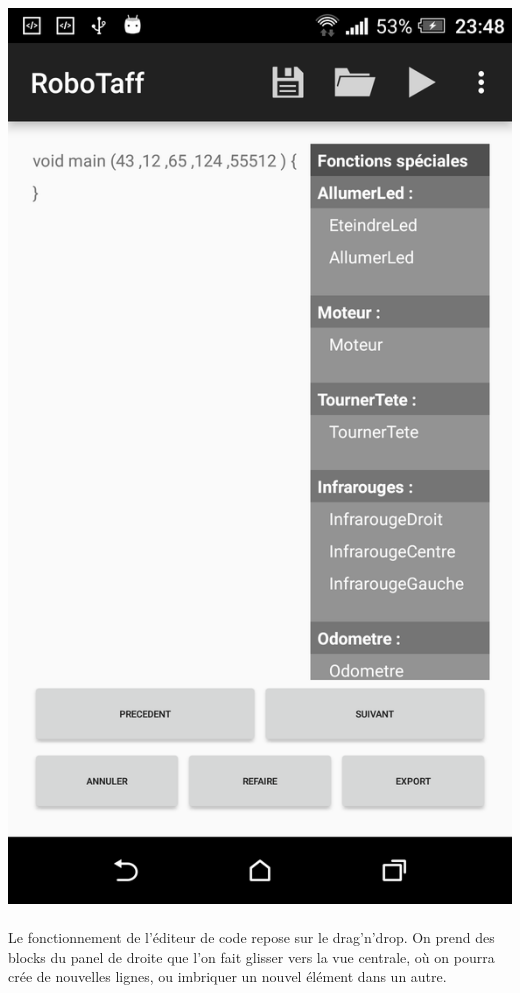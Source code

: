 \documentclass[a4paper]{article}
\begin{document}
\begin{center}
\includegraphics[scale=0.2]{img/main_app.png}
\end{center}

\paragraph{}
Le fonctionnement de l’éditeur de code repose sur le drag'n'drop. On prend des blocks du panel de droite que l’on fait glisser vers la vue centrale, où on pourra crée de nouvelles lignes, ou imbriquer un nouvel élément dans un autre.
\end{document}
